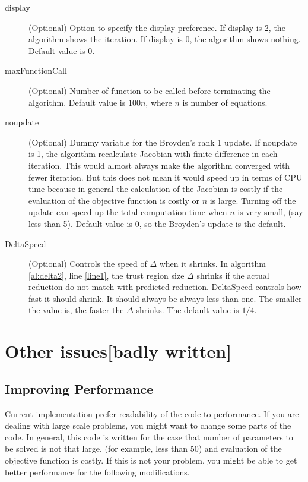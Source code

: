 \documentclass[12pt]{article}
\begin{document}
\begin{description}
	\item[display] (Optional) Option to specify the display preference. If display is 2, the
      algorithm shows the iteration. If display is 0, the algorithm shows nothing. Default value
      is 0. 
	\item[maxFunctionCall] (Optional) Number of function to be called before
      terminating the algorithm. Default value is $100n$, where $n$ is number of equations. 
	\item[noupdate] (Optional) Dummy variable for the Broyden's rank 1 update. If noupdate is 1,
      the algorithm recalculate Jacobian with finite difference in each iteration. This would
      almost always make the algorithm converged with fewer iteration. But this does not mean it
      would speed up in terms of CPU time because in general the calculation of the Jacobian is
      costly if the evaluation of the objective function is costly or $n$ is large. Turning off
      the update can speed up the total computation time when $n$ is very small, (say less than
      5). Default value is 0, so the Broyden's update is the default.
	\item[DeltaSpeed] (Optional) Controls the speed of $\Delta$ when it shrinks. In algorithm
      \ref{al:delta2}, line \ref{line1}, the trust region size $\Delta$ shrinks if the actual
      reduction do not match with predicted reduction. DeltaSpeed controls how fast it should
      shrink. It should always be always less than one. The smaller the value is, the faster the
      $\Delta$ shrinks. The default value is $1/4$.
\end{description}



\section{Other issues[badly written]}


\subsection{Improving Performance}
Current implementation prefer readability of the code to performance. If you are dealing with
large scale problems, you might want to change some parts of the code. In general, this code is
written for the case that number of parameters to be solved is not that large, (for example, less
than 50) and evaluation of the objective function is costly. If this is not your problem, you
might be able to get better performance for the following modifications.
\end{document}
